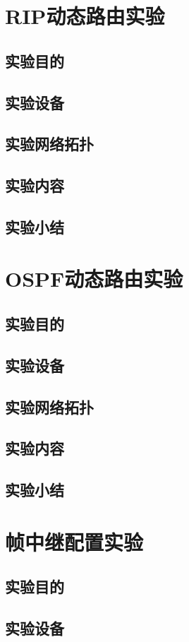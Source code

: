 \documentclass[lang=cn,11pt,a4paper,cite=authoryear]{elegantpaper}
\begin{document}
\section{RIP动态路由实验}
\subsection{实验目的}
\subsection{实验设备}
\subsection{实验网络拓扑}
\subsection{实验内容}
\subsection{实验小结}
\section{OSPF动态路由实验}
\subsection{实验目的}
\subsection{实验设备}
\subsection{实验网络拓扑}
\subsection{实验内容}
\subsection{实验小结}
\section{帧中继配置实验}
\subsection{实验目的}
\subsection{实验设备}
\end{document}
